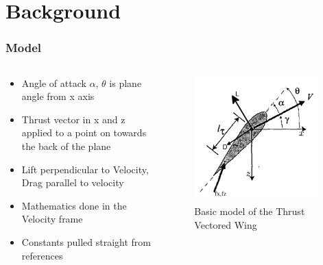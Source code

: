\documentclass{beamer}
\begin{document}
    \section{Background}
    \begin{frame}
        \frametitle{Model}
        \begin{columns}[c]
            \begin{column}{0.6\textwidth}
                \begin{itemize}
                    \item Angle of attack $\alpha$, $\theta$ is plane angle from x axis
                    \item Thrust vector in x and z applied to a point on towards the back of the plane
                    \item Lift perpendicular to Velocity, Drag parallel to velocity
                    \item Mathematics done in the Velocity frame
                    \item Constants pulled straight from references
                \end{itemize}
            \end{column}
            \begin{column}{0.4\textwidth}
                \begin{figure}
                    \includegraphics[width=0.95\textwidth]{wing_model.png}
                    \caption*{Basic model of the Thrust Vectored Wing}
                \end{figure}
            \end{column}
        \end{columns}
    \end{frame}
\end{document}

